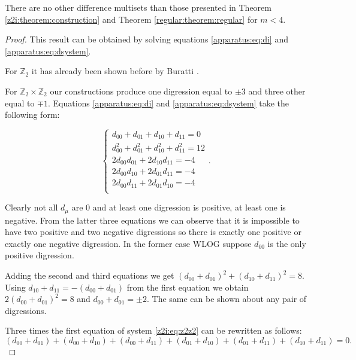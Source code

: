 \begin{theorem}
    There are no other difference multisets than those presented in Theorem \ref{z2i:theorem:construction} and Theorem \ref{regular:theorem:regular} for $m < 4$.
\end{theorem}

\begin{proof}
    This result can be obtained by solving equations \eqref{apparatus:eq:di} and \eqref{apparatus:eq:dsystem}.
    
    For $\mathbb Z_2$ it has already been shown before by Buratti \cite{buratti1999old}.
    
    For $\mathbb Z_2 \times \mathbb Z_2$ our constructions produce one digression equal to $\pm 3$ and three other equal to $\mp 1$. Equations \eqref{apparatus:eq:di} and \eqref{apparatus:eq:dsystem} take the following form:
    
    \begin{equation}
        \label{z2i:eq:z2z2}
        \begin{cases}
            d_{00} + d_{01} + d_{10} + d_{11} = 0 \\
            d_{00}^2 + d_{01}^2 + d_{10}^2 + d_{11}^2 = 12 \\
            2 d_{00}d_{01} + 2 d_{10}d_{11} = -4 \\
            2 d_{00}d_{10} + 2 d_{01}d_{11} = -4 \\
            2 d_{00}d_{11} + 2 d_{01}d_{10} = -4 \\
        \end{cases}.
    \end{equation}
    
    Clearly not all $d_\mu$ are $0$ and at least one digression is positive, at least one is negative. From the latter three equations we can observe that it is impossible to have two positive and two negative digressions so there is exactly one positive or exactly one negative digression. In the former case WLOG suppose $d_{00}$ is the only positive digression.
    
    Adding the second and third equations we get $(d_{00}+d_{01})^2+(d_{10}+d_{11})^2=8$. Using $d_{10}+d_{11} = -(d_{00}+d_{01})$ from the first equation we obtain $2(d_{00}+d_{01})^2=8$ and $d_{00}+d_{01} = \pm 2$. The same can be shown about any pair of digressions.
    
    Three times the first equation of system \eqref{z2i:eq:z2z2} can be rewritten as follows:
    \begin{equation*}
        (d_{00}+d_{01}) + (d_{00}+d_{10}) + (d_{00}+d_{11}) + (d_{01}+d_{10}) + (d_{01}+d_{11}) + (d_{10}+d_{11}) = 0.
    \end{equation*}
    

\end{proof}
